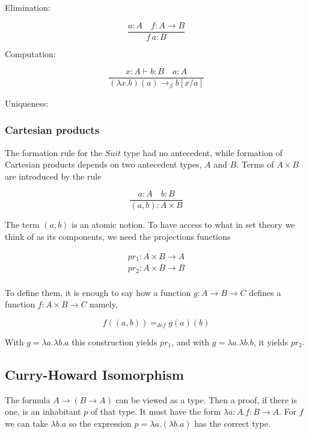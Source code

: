 Elimination:

\begin{equation}
\frac{a : A \quad f : A \to B }{ f \,a : B}
\end{equation}

Computation:

\begin{equation}
\frac{x :  A \vdash b : B \quad a: A }{(\lambda x. b)(a) \to_\beta b[x/a]}
\end{equation}


Uniqueness: 


\subsubsection{Cartesian products}

The formation rule for the $Suit$ type had no antecedent, while formation of  Cartesian products depends on two antecedent types, $A$  and $B$. Terms of $A\times B$ are introduced by the rule 

\begin{equation}
\frac{a : A \quad b : B}{(a,b) : A \times B}
\end{equation}

The term $(a,b)$ is an atomic notion. To have access to what in set theory we think of as its components, we need the projections functions 

\begin{align}
pr_1 : A \times B \to A \\
pr_2 : A \times B \to B \\
\end{align}

To define them, it is enough to say how a function $g : A \to B \to C$ defines a function $f: A\times B \to C$ namely,

\begin{equation}
f((a,b)) =_{def} g(a)(b)
\end{equation}


With $g =\lambda a.\lambda b . a$ this construction yields $pr_1$, and with 
$g =\lambda a.\lambda b . b$, it yields $pr_2$.  





\subsection{Curry-Howard Isomorphism}

 The formula $A \to (B \to A)$ can be viewed as a type.  Then a proof, if there is one, is an inhabitant $p$ of that type. It must have the form $\lambda a: A.f:B \to A$.  For $f$ we can take $\lambda b.a$ so the expression $p = \lambda a.(\lambda b.a)$ has the correct type.




